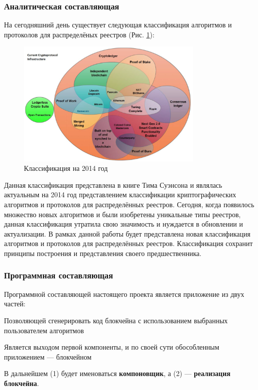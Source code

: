 \subsubsection{Аналитическая составляющая}
На сегодняшний день существует следующая классификация алгоритмов и протоколов
для распределёных реестров (Рис. \ref{2014protocol}):

\begin{figure}[h!]
    \centering
    \includegraphics[width=0.8\textwidth]{./images/current_protocols}
    \caption{Классификация на 2014 год \cite{TimSwanson2014}}\label{2014protocol}
\end{figure}

Данная классификация представлена в книге Тима Суэнсона \cite{TimSwanson2014} и
являлась актуальным на 2014 год представлением классификации криптографических
алгоритмов и протоколов для распределённых реестров. Сегодня, когда появилось
множество новых алгоритмов и были изобретены уникальные типы реестров, данная
классификация утратила свою значимость и нуждается в обновлении и
актуализации. В рамках данной работы будет представлена новая классификация
алгоритмов и протоколов для распределённых реестров. Классификация сохранит
принципы построения и представления своего предшественника.

\subsubsection{Программная составляющая}
Программной составляющей настоящего проекта является приложение из двух частей:
\begin{my_enumerate}
    \item Позволяющей сгенерировать код блокчейна с использованием выбранных
          пользователем алгоритмов
    \item Является выходом первой компоненты, и по своей сути обособленным приложением --- блокчейном
\end{my_enumerate}
В дальнейшем (1) будет именоваться \textbf{компоновщик}, а (2) --- \textbf{реализация блокчейна}. 

